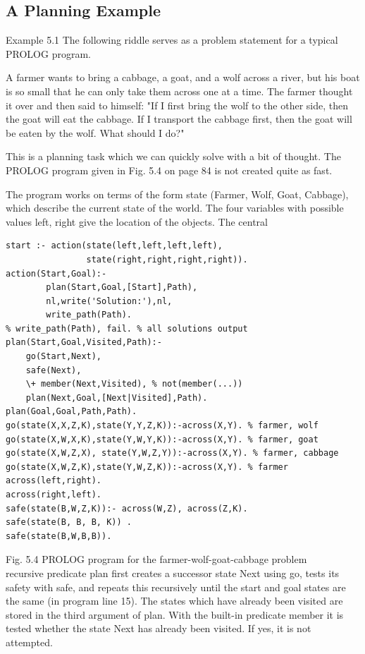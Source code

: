 \documentclass[10pt]{article}
\begin{document}
\subsection*{A Planning Example}
Example 5.1 The following riddle serves as a problem statement for a typical PROLOG program.

A farmer wants to bring a cabbage, a goat, and a wolf across a river, but his boat is so small that he can only take them across one at a time. The farmer thought it over and then said to himself: "If I first bring the wolf to the other side, then the goat will eat the cabbage. If I transport the cabbage first, then the goat will be eaten by the wolf. What should I do?"

This is a planning task which we can quickly solve with a bit of thought. The PROLOG program given in Fig. 5.4 on page 84 is not created quite as fast.

The program works on terms of the form state (Farmer, Wolf, Goat, Cabbage), which describe the current state of the world. The four variables with possible values left, right give the location of the objects. The central

\begin{verbatim}
start :- action(state(left,left,left,left),
                state(right,right,right,right)).
action(Start,Goal):-
        plan(Start,Goal,[Start],Path),
        nl,write('Solution:'),nl,
        write_path(Path).
% write_path(Path), fail. % all solutions output
plan(Start,Goal,Visited,Path):-
    go(Start,Next),
    safe(Next),
    \+ member(Next,Visited), % not(member(...))
    plan(Next,Goal,[Next|Visited],Path).
plan(Goal,Goal,Path,Path).
go(state(X,X,Z,K),state(Y,Y,Z,K)):-across(X,Y). % farmer, wolf
go(state(X,W,X,K),state(Y,W,Y,K)):-across(X,Y). % farmer, goat
go(state(X,W,Z,X), state(Y,W,Z,Y)):-across(X,Y). % farmer, cabbage
go(state(X,W,Z,K),state(Y,W,Z,K)):-across(X,Y). % farmer
across(left,right).
across(right,left).
safe(state(B,W,Z,K)):- across(W,Z), across(Z,K).
safe(state(B, B, B, K)) .
safe(state(B,W,B,B)).
\end{verbatim}

Fig. 5.4 PROLOG program for the farmer-wolf-goat-cabbage problem\\
recursive predicate plan first creates a successor state Next using go, tests its safety with safe, and repeats this recursively until the start and goal states are the same (in program line 15). The states which have already been visited are stored in the third argument of plan. With the built-in predicate member it is tested whether the state Next has already been visited. If yes, it is not attempted.
\end{document}
